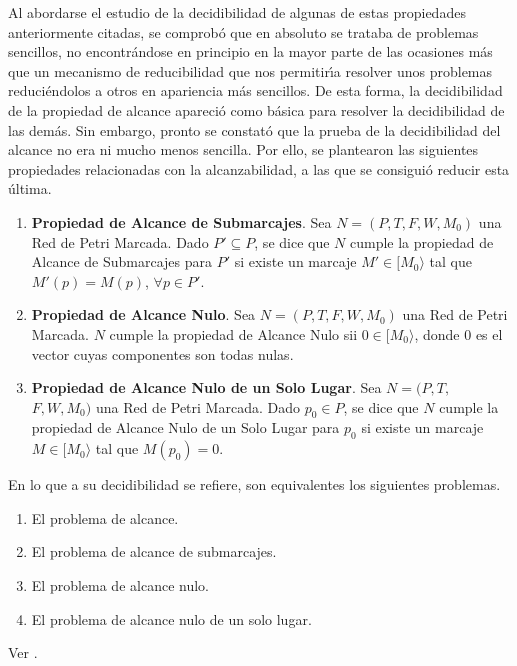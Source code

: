 Al abordarse el estudio de la decidibilidad de algunas de
estas propiedades anteriormente citadas, se comprob\'{o} que en absoluto se
trataba de problemas sencillos, no encontr\'{a}ndose en principio en la
mayor parte de las ocasiones m\'{a}s que un me\-ca\-nis\-mo
de reducibilidad que nos permitir\'{\i}a resolver unos problemas
reduci\'{e}ndolos a otros en apariencia m\'{a}s sencillos.
De esta forma, la decidibilidad
de la propiedad de alcance apareci\'{o} como b\'{a}sica para resolver la
decidibilidad de las dem\'{a}s.
Sin embargo, pronto se constat\'{o} que la prueba de la decidibilidad del
alcance no era ni mucho menos sencilla. Por ello, se
plantearon las siguientes propiedades relacionadas con la
alcanzabilidad, a las que se consigui\'{o} reducir esta \'{u}ltima.
\begin{enumerate}
\item {\bf Propiedad de Alcance de Submarcajes}.
Sea $N=(P,T,F,W,M_0)$ una Red de Petri Marcada. Dado $P' \subseteq P$,
se dice que $N$ cumple la propiedad de Alcance de Submarcajes para $P'$
si existe un marcaje $M' \in [M_0 \rangle$
tal que $M'(p) = M(p)$, $\forall p \in P'$.
\item {\bf Propiedad de Alcance Nulo}.
Sea $N=(P,T,F,W,M_0)$ una Red de Petri Marcada.
$N$ cumple la propiedad de Alcance Nulo sii $0 \in [ M_0 \rangle$, donde
0 es el vector cuyas componentes son todas nulas.
\item {\bf Propiedad de Alcance Nulo de un Solo Lugar}.
Sea $N=(P,T,$ \linebreak $F,W,M_0)$ una Red de Petri Marcada.
Dado $p_0 \in P$, se dice que $N$ cumple la propiedad de Alcance Nulo
de un Solo Lugar para $p_0$ si existe un marcaje
$M \in [ M_0 \rangle$ tal que $M(p_0) = 0$.
\end{enumerate}

\begin{theorem} En lo que a su decidibilidad se refiere, son
equivalentes los siguientes problemas.
\begin{enumerate}
\item El problema de alcance.
\item El problema de alcance de submarcajes.
\item El problema de alcance nulo.
\item El problema de alcance nulo de un solo lugar.
\end{enumerate}

\proof Ver \cite{Pet81}.
\end{theorem}

